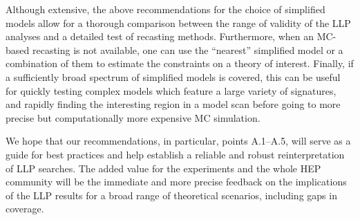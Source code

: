 \noindent
Although extensive, the above recommendations for the choice of simplified
models allow for a thorough comparison between the range of validity of
the LLP analyses and a detailed test of recasting methods.
Furthermore, when an MC-based recasting is not available, one
can use the ``nearest'' simplified model or a combination of them to
estimate the constraints on a theory of interest.
Finally, if a sufficiently broad spectrum of simplified models is covered, this can
be useful for quickly testing complex models which feature a large variety of signatures,
and rapidly finding the interesting region in a model scan before going to more precise but
computationally more expensive MC simulation.

We hope that our recommendations, in particular, points A.1--A.5, will serve as a guide for best practices and help establish a reliable and robust reinterpretation of LLP searches.
The added value for the experiments and the whole HEP community will be the immediate and more precise feedback on the implications of the LLP results for a broad range of theoretical scenarios, including gaps in coverage.





